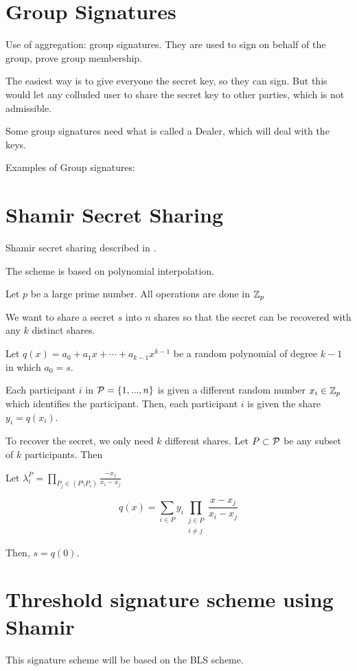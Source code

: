 \newpage
\section{Group Signatures}
Use of aggregation: group signatures. They are used to sign on behalf of the group, prove group membership.

The easiest way is to give everyone the secret key, so they can sign. But this would let any colluded user to share the secret key to other parties, which is not admissible.

Some group signatures need what is called a Dealer, which will deal with the keys.

Examples of Group signatures:

\section{Shamir Secret Sharing}
Shamir secret sharing described in \cite{Sham79}.

The scheme is based on polynomial interpolation.

Let $p$ be a large prime number. All operations are done in ${\mathbb Z}_p$

We want to share a secret $s$ into $n$ shares so that the secret can be recovered with any $k$ distinct shares.

Let $q(x) = a_0 + a_1 x + \cdots + a_{k-1} x^{k-1}$ be a random polynomial of degree $k-1$ in which $a_0 = s$.

Each participant $i$ in ${\mathcal P} = \{ 1, ... , n \}$ is given a different random number $x_i \in {\mathbb Z}_p$ which identifies the participant.
Then, each participant $i$ is given the share $y_i = q(x_i)$.

To recover the secret, we only need $k$ different shares. Let $P \subset {\mathcal P}$ be any subset of $k$ participants. Then

Let $\lambda_i^{P} = \prod_{P_j \in (P \setminus P_i)} \frac{-x_j}{x_i - x_j}$

$$
    q(x) = \sum_{i \in P} y_i \prod_{\substack{j \in P \\ i \neq j}} \frac{x-x_j}{x_i-x_j}
$$

Then, $s = q(0)$.

\section{Threshold signature scheme using Shamir}
\label{sec:shamir_sig}

This signature scheme will be based on the BLS scheme.

